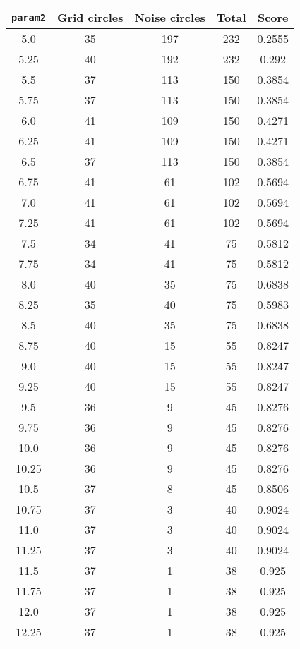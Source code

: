 \documentclass[letterpaper, 12pt]{article}
\begin{document}
\begin{longtable}{|c|c|c|c|c|}
\hline
\textbf{\texttt{param2}} & \textbf{Grid circles} & \textbf{Noise circles} & \textbf{Total} & \textbf{Score} \\
\hline
5.0 & 35 & 197 & 232 & 0.2555 \\
\hline
5.25 & 40 & 192 & 232 & 0.292 \\
\hline
5.5 & 37 & 113 & 150 & 0.3854 \\
\hline
5.75 & 37 & 113 & 150 & 0.3854 \\
\hline
6.0 & 41 & 109 & 150 & 0.4271 \\
\hline
6.25 & 41 & 109 & 150 & 0.4271 \\
\hline
6.5 & 37 & 113 & 150 & 0.3854 \\
\hline
6.75 & 41 & 61 & 102 & 0.5694 \\
\hline
7.0 & 41 & 61 & 102 & 0.5694 \\
\hline
7.25 & 41 & 61 & 102 & 0.5694 \\
\hline
7.5 & 34 & 41 & 75 & 0.5812 \\
\hline
7.75 & 34 & 41 & 75 & 0.5812 \\
\hline
8.0 & 40 & 35 & 75 & 0.6838 \\
\hline
8.25 & 35 & 40 & 75 & 0.5983 \\
\hline
8.5 & 40 & 35 & 75 & 0.6838 \\
\hline
8.75 & 40 & 15 & 55 & 0.8247 \\
\hline
9.0 & 40 & 15 & 55 & 0.8247 \\
\hline
9.25 & 40 & 15 & 55 & 0.8247 \\
\hline
9.5 & 36 & 9 & 45 & 0.8276 \\
\hline
9.75 & 36 & 9 & 45 & 0.8276 \\
\hline
10.0 & 36 & 9 & 45 & 0.8276 \\
\hline
10.25 & 36 & 9 & 45 & 0.8276 \\
\hline
10.5 & 37 & 8 & 45 & 0.8506 \\
\hline
10.75 & 37 & 3 & 40 & 0.9024 \\
\hline
11.0 & 37 & 3 & 40 & 0.9024 \\
\hline
11.25 & 37 & 3 & 40 & 0.9024 \\
\hline
11.5 & 37 & 1 & 38 & 0.925 \\
\hline
11.75 & 37 & 1 & 38 & 0.925 \\
\hline
12.0 & 37 & 1 & 38 & 0.925 \\
\hline
12.25 & 37 & 1 & 38 & 0.925 \\
\hline

\end{longtable}
\end{document}
